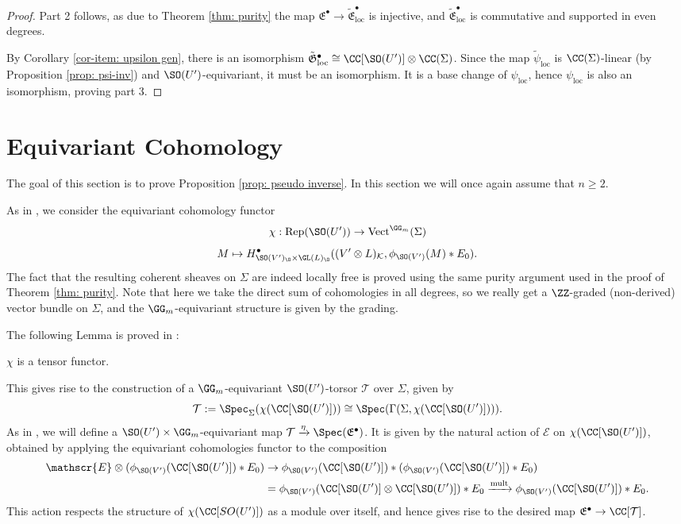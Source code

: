 \documentclass[11pt]{article}
\begin{document}
\begin{proof}
    Part 2 follows, as due to Theorem \ref{thm: purity} the map $\mathfrak{E}^\bullet\to \tilde{\mathfrak{E}}^\bullet_\mathrm{loc}$ is injective, and $\tilde{\mathfrak{E}}^\bullet_\mathrm{loc}$ is commutative and supported in even degrees.

    By Corollary \ref{cor-item: upsilon gen}, there is an isomorphism $\tilde{\mathfrak{G}}^\bullet_{\mathrm{loc}} \cong \CC[\SO(U')]\otimes \CC(\Sigma)$. Since the map $\tilde{\psi}_\mathrm{loc}$ is $\CC(\Sigma)$-linear (by Proposition \ref{prop: psi-inv}) and $\SO(U')$-equivariant, it must be an isomorphism. It is a base change of $\psi_\mathrm{loc}$, hence $\psi_\mathrm{loc}$ is also an isomorphism, proving part 3.
\end{proof}

\section{Equivariant Cohomology}\label{sec: equivariant cohomology}
The goal of this section is to prove Proposition \ref{prop: pseudo inverse}.
In this section we will once again assume that $n\geq 2$.

As in \cite[§3.5]{BFKT}, we consider the equivariant cohomology functor
$$\chi:\mathrm{Rep}(\SO(U'))\to \mathrm{Vect}^{\GG_m}(\Sigma)$$
$$M\mapsto H^\bullet_{\SO(V')_\O\times \GL(L)_\O}((V'\otimes L)_\mathcal{K}, \phi_{\SO(V')}(M)*E_0).$$
The fact that the resulting coherent sheaves on $\Sigma$ are indeed locally free is proved using the same purity argument used in the proof of Theorem \ref{thm: purity}.
Note that here we take the direct sum of cohomologies in all degrees, so we really get a $\ZZ$-graded (non-derived) vector bundle on $\Sigma$, and the $\GG_m$-equivariant structure is given by the grading.

The following Lemma is proved in \cite[Lemma 3.5.1]{BFKT}:
\begin{lemma}
$\chi$ is a tensor functor.
\end{lemma}
This gives rise to the construction of a $\GG_m$-equivariant $\SO(U')$-torsor $\mathcal{T}$ over $\Sigma$, given by $$\mathcal{T}:=\Spec_{\Sigma}(\chi(\CC[\SO(U')]))\cong \Spec(\Gamma(\Sigma, \chi(\CC[\SO(U')]))).$$
As in \cite{BFKT}, we will define a $\SO(U')\times \GG_m$-equivariant map $\mathcal{T}\xrightarrow{\eta} \Spec(\mathfrak{E}^\bullet)$.
It is given by the natural action of $\mathscr{E}$ on $\chi(\CC[\SO(U')])$, obtained by applying the equivariant cohomologies functor to the composition
$$\begin{aligned}
    \mathscr{E}\otimes(\phi_{\SO(V')}(\CC[\SO(U')])*E_0)&\to \phi_{\SO(V')}(\CC[\SO(U')])*(\phi_{\SO(V')}(\CC[\SO(U')])*E_0) \\&= \phi_{\SO(V')}(\CC[\SO(U')]\otimes \CC[\SO(U')])*E_0\xrightarrow{\mathrm{mult}}\phi_{\SO(V')}(\CC[\SO(U')])*E_0.
\end{aligned}$$
This action respects the structure of $\chi(\CC[SO(U')])$ as a module over itself, and hence gives rise to the desired map $\mathfrak{E}^\bullet\to \CC[\mathcal{T}]$.
\end{document}
